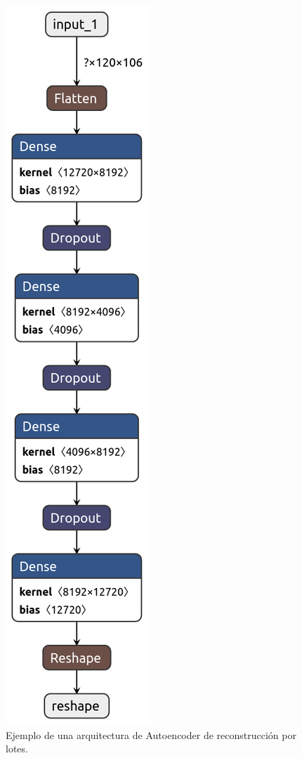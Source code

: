 \begin{figure}[H]
	\centering
	\includegraphics[scale=0.4]{imagenes/autoencoder-fcc-batch.png}
	\caption{Ejemplo de una arquitectura de Autoencoder de reconstrucción por lotes.}
	\label{img:autoencoder-fcc-batch}
\end{figure}

